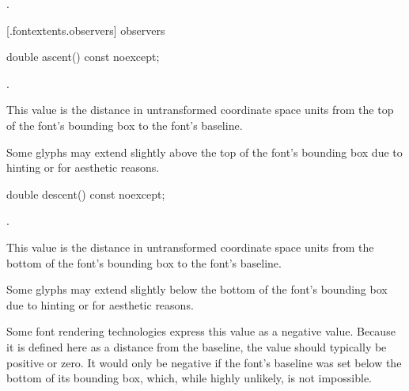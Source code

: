 \begin{itemdescr}
	\pnum
	\postconditions
	.
	
\end{itemdescr}

 [\iotwod.fontextents.observers]{ observers}

\begin{itemdecl}
    double ascent() const noexcept;
\end{itemdecl}
\begin{itemdescr}
	\pnum
	\returns
	.
	
	\pnum
	\remarks
	This value is the distance in untransformed coordinate space units from the top of the font's bounding box to the font's baseline.
	
	\pnum
	Some glyphs may extend slightly above the top of the font's bounding box due to hinting or for aesthetic reasons.

\end{itemdescr}

\begin{itemdecl}
    double descent() const noexcept;
\end{itemdecl}
\begin{itemdescr}
	\pnum
	\returns
	.
	
	\pnum
	\remarks
	This value is the distance in untransformed coordinate space units from the bottom of the font's bounding box to the font's baseline.
	
	\pnum
	Some glyphs may extend slightly below the bottom of the font's bounding box due to hinting or for aesthetic reasons.
	
	\pnum
	\enternote
	Some font rendering technologies express this value as a negative value. Because it is defined here as a distance from the baseline, the value should typically be positive or zero. It would only be negative if the font's baseline was set below the bottom of its bounding box, which, while highly unlikely, is not impossible.
	\exitnote

\end{itemdescr}


